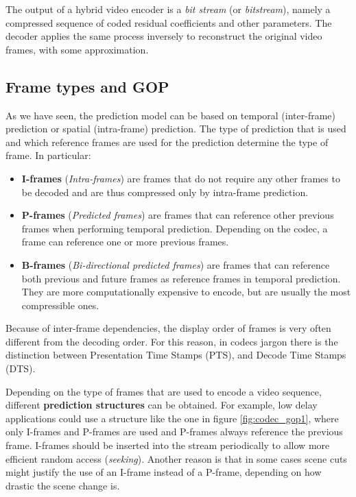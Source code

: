 The output of a hybrid video encoder is a \textit{bit stream} (or \textit{bitstream}), namely a compressed sequence of coded residual coefficients and other parameters. The decoder applies the same process inversely to reconstruct the original video frames, with some approximation.

\subsection{Frame types and GOP}
\label{sec:bg/compression/gop}

As we have seen, the prediction model can be based on temporal (inter-frame) prediction or spatial (intra-frame) prediction. The type of prediction that is used and which reference frames are used for the prediction determine the type of frame. In particular:

\begin{itemize}
    \item \textbf{I-frames} (\textit{Intra-frames}) are frames that do not require any other frames to be decoded and are thus compressed only by intra-frame prediction.
    \item \textbf{P-frames} (\textit{Predicted frames}) are frames that can reference other previous frames when performing temporal prediction. Depending on the codec, a frame can reference one or more previous frames.
    \item \textbf{B-frames} (\textit{Bi-directional predicted frames}) are frames that can reference both previous and future frames as reference frames in temporal prediction. They are more computationally expensive to encode, but are usually the most compressible ones.
\end{itemize}

Because of inter-frame dependencies, the display order of frames is very often different from the decoding order. For this reason, in codecs jargon there is the distinction between Presentation Time Stamps (PTS), and Decode Time Stamps (DTS).

Depending on the type of frames that are used to encode a video sequence, different \textbf{prediction structures} can be obtained. For example, low delay applications could use a structure like the one in figure \ref{fig:codec_gop1}, where only I-frames and P-frames are used and P-frames always reference the previous frame. I-frames should be inserted into the stream periodically to allow more efficient random access (\textit{seeking}). Another reason is that in some cases scene cuts might justify the use of an I-frame instead of a P-frame, depending on how drastic the scene change is.

